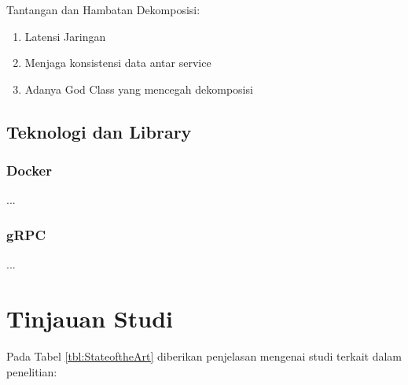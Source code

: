 Tantangan dan Hambatan Dekomposisi:
\begin{enumerate}[leftmargin=1.3cm]
	\item Latensi Jaringan
	\item Menjaga konsistensi data antar service
	\item Adanya God Class yang mencegah dekomposisi
\end{enumerate}	

\subsection{Teknologi dan Library}
\subsubsection{Docker}
...
\subsubsection{gRPC}
...

\section{Tinjauan Studi}
\par Pada Tabel \ref{tbl:StateoftheArt} diberikan penjelasan mengenai studi terkait dalam penelitian:

